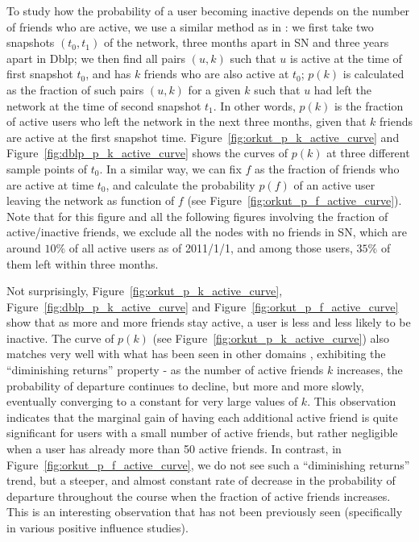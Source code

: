 \documentclass[phd,tocprelim]{cornell}
\begin{document}
To study how the probability of a user becoming inactive depends on the number of friends who are active, we use a similar method as in \cite{Backstrom:2006}: we first take two snapshots $(t_0, t_1)$ of the network, three months apart in SN and three years apart in Dblp; we then find all pairs $(u,k)$ such that $u$ is active at the time of first snapshot $t_0$, and has $k$ friends who are also active at $t_0$; $p(k)$ is calculated as the fraction of such pairs $(u,k)$ for a given $k$ such that $u$ had left the network at the time of second snapshot $t_1$. In other words, $p(k)$ is the fraction of active users who left the network in the next three months, given that $k$ friends are active at the first snapshot time. Figure~\ref{fig:orkut_p_k_active_curve} and Figure~\ref{fig:dblp_p_k_active_curve} shows the curves of $p(k)$ at three different sample points of $t_0$. In a similar way, we can fix $f$ as the fraction of friends who are active at time $t_0$, and calculate the probability $p(f)$ of an active user leaving the network as function of $f$ (see Figure~\ref{fig:orkut_p_f_active_curve}). Note that for this figure and all the following figures involving the fraction of active/inactive friends, we exclude all the nodes with no friends in SN, which are around $10\%$ of all active users as of 2011/1/1, and among those users, $35\%$ of them left within three months. 

Not surprisingly, Figure~\ref{fig:orkut_p_k_active_curve}, Figure~\ref{fig:dblp_p_k_active_curve} and Figure~\ref{fig:orkut_p_f_active_curve} show that as more and more friends stay active, a user is less and less likely to be inactive. The curve of $p(k)$ (see Figure~\ref{fig:orkut_p_k_active_curve}) also matches very well with what has been seen in other domains \cite{Backstrom:2006}, exhibiting the ``diminishing returns'' property - as the number of active friends $k$ increases, the probability of departure continues to decline, but more and more slowly, eventually converging to a constant for very large values of $k$. This observation indicates that the marginal gain of having each additional active friend is quite significant for users with a small number of active friends, but rather negligible when a user has already more than 50 active friends. In contrast, in Figure~\ref{fig:orkut_p_f_active_curve}, we do not see such a ``diminishing returns'' trend, but a steeper, and almost constant rate of decrease in the probability of departure throughout the course when the fraction of active friends increases. This is an interesting observation that has not been previously seen (specifically in various positive influence studies). 
\end{document}
